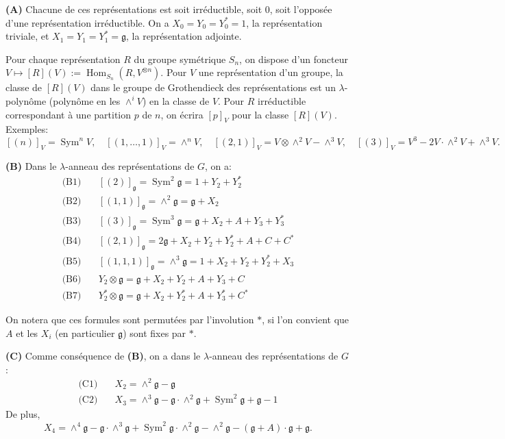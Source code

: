 \documentclass[11pt,a4paper]{article}
\DeclareMathOperator{\Sym}{Sym}
\DeclareMathOperator{\Hom}{Hom}
\newcommand{\frg}{\mathfrak{g}}
\begin{document}
\medskip
\noindent\textbf{(A)} Chacune de ces repr\'esentations est soit irr\'eductible, soit $0$, soit l'oppos\'ee d'une repr\'esentation irr\'eductible. On a $X_0 = Y_0 = Y_0^* = 1$, la repr\'esentation triviale, et $X_1 = Y_1 = Y_1^* = \frg$, la repr\'esentation adjointe.

\medskip
\noindent Pour chaque repr\'esentation $R$ du groupe sym\'etrique $S_n$, on dispose d'un foncteur $V \mapsto [R](V) := \Hom_{S_n}(R, V^{\otimes n})$. Pour $V$ une repr\'esentation d'un groupe, la classe de $[R](V)$ dans le groupe de Grothendieck des repr\'esentations est un $\lambda$-polyn\^ome (polyn\^ome en les $\wedge^i V$) en la classe de $V$. Pour $R$ irr\'eductible correspondant \`a une partition $p$ de $n$, on \'ecrira $[p]_V$ pour la classe $[R](V)$. Exemples:
$$
[(n)]_V = \Sym^n V, \quad [(1, \ldots, 1)]_V = \wedge^n V, \quad [(2,1)]_V = V \otimes \wedge^2 V - \wedge^3 V, \quad [(3)]_V = V^3 - 2V \cdot \wedge^2 V + \wedge^3 V.
$$

\medskip
\noindent\textbf{(B)} Dans le $\lambda$-anneau des repr\'esentations de $G$, on a:
\begin{align*}
\text{(B1)} \quad & [(2)]_{\frg} = \Sym^2 \frg = 1 + Y_2 + Y_2^* \\
\text{(B2)} \quad & [(1,1)]_{\frg} = \wedge^2 \frg = \frg + X_2 \\
\text{(B3)} \quad & [(3)]_{\frg} = \Sym^3 \frg = \frg + X_2 + A + Y_3 + Y_3^* \\
\text{(B4)} \quad & [(2,1)]_{\frg} = 2\frg + X_2 + Y_2 + Y_2^* + A + C + C^* \\
\text{(B5)} \quad & [(1,1,1)]_{\frg} = \wedge^3 \frg = 1 + X_2 + Y_2 + Y_2^* + X_3 \\
\text{(B6)} \quad & Y_2 \otimes \frg = \frg + X_2 + Y_2 + A + Y_3 + C \\
\text{(B7)} \quad & Y_2^* \otimes \frg = \frg + X_2 + Y_2^* + A + Y_3^* + C^*
\end{align*}

On notera que ces formules sont permut\'ees par l'involution $*$, si l'on convient que $A$ et les $X_i$ (en particulier $\frg$) sont fixes par $*$.

\medskip
\noindent\textbf{(C)} Comme cons\'equence de \textbf{(B)}, on a dans le $\lambda$-anneau des repr\'esentations de $G$:
\begin{align*}
\text{(C1)} \quad & X_2 = \wedge^2 \frg - \frg \\
\text{(C2)} \quad & X_3 = \wedge^3 \frg - \frg \cdot \wedge^2 \frg + \Sym^2 \frg + \frg - 1
\end{align*}
De plus,
$$
X_4 = \wedge^4 \frg - \frg \cdot \wedge^3 \frg + \Sym^2 \frg \cdot \wedge^2 \frg - \wedge^2 \frg - (\frg + A) \cdot \frg + \frg.
$$
\end{document}
